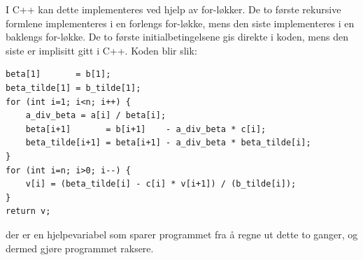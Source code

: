 \documentclass[a4paper,10pt,english]{article}
\begin{document}
I C++ kan dette implementeres ved hjelp av for-løkker. De to første rekursive formlene implementeres i en forlengs for-løkke, mens den siste implementeres i en baklengs for-løkke. De to første initialbetingelsene gis direkte i koden, mens den siste er implisitt gitt i C++. Koden blir slik:

\begin{lstlisting}
beta[1]       = b[1];
beta_tilde[1] = b_tilde[1];
for (int i=1; i<n; i++) {
	a_div_beta = a[i] / beta[i];
	beta[i+1]       = b[i+1]    - a_div_beta * c[i];
	beta_tilde[i+1] = beta[i+1] - a_div_beta * beta_tilde[i];
}
for (int i=n; i>0; i--) {
	v[i] = (beta_tilde[i] - c[i] * v[i+1]) / (b_tilde[i]);
}
return v;
\end{lstlisting}

der  er en hjelpevariabel som sparer programmet fra å regne ut dette to ganger, og dermed gjøre programmet raksere.
\end{document}
